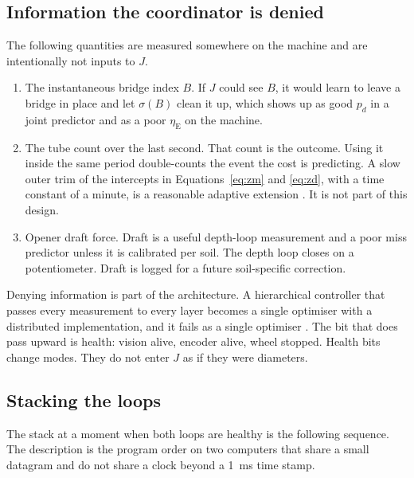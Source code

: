 \subsection{Information the coordinator is denied}

The following quantities are measured somewhere on the machine and are intentionally not inputs to $J$.

\begin{enumerate}
\item The instantaneous bridge index $B$. If $J$ could see $B$, it would learn to leave a bridge in place and let $\sigma(B)$ clean it up, which shows up as good $p_d$ in a joint predictor and as a poor $\eta_{\mathrm{E}}$ on the machine.
\item The tube count over the last second. That count is the outcome. Using it inside the same period double-counts the event the cost is predicting. A slow outer trim of the intercepts in Equations~\eqref{eq:zm} and \eqref{eq:zd}, with a time constant of a minute, is a reasonable adaptive extension \cite{ljung1999,kalman1960,welch1995}. It is not part of this design.
\item Opener draft force. Draft is a useful depth-loop measurement and a poor miss predictor unless it is calibrated per soil. The depth loop closes on a potentiometer. Draft is logged for a future soil-specific correction.
\end{enumerate}

Denying information is part of the architecture. A hierarchical controller that passes every measurement to every layer becomes a single optimiser with a distributed implementation, and it fails as a single optimiser \cite{skogestad2005}. The bit that does pass upward is health: vision alive, encoder alive, wheel stopped. Health bits change modes. They do not enter $J$ as if they were diameters.

\subsection{Stacking the loops}

The stack at a moment when both loops are healthy is the following sequence. The description is the program order on two computers that share a small datagram and do not share a clock beyond a 1~ms time stamp.

